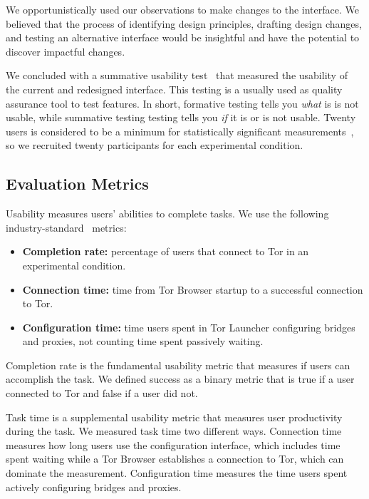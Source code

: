 \documentclass[USenglish,oneside,twocolumn]{article}
\begin{document}
We opportunistically used our observations to make changes to the interface. We believed that the process of identifying design principles, drafting design changes, and testing an alternative interface would be insightful and have the potential to discover impactful changes.

We concluded with a summative usability test~\cite{summative} that measured the usability of the current and redesigned interface. This testing is a usually used as quality assurance tool to test features. In short, formative testing tells you {\it what} is is not usable, while summative testing testing tells you {\it if} it is or is not usable. Twenty users is considered to be a minimum for statistically significant measurements~\cite{howmanyusers}, so we recruited twenty participants for each experimental condition.  

\subsection{Evaluation Metrics}
\label{sec:eval}
Usability measures users' abilities to complete tasks. We use the following industry-standard~\cite{albert2013measuring} metrics: \\

\begin{itemize}
\item {\bfseries Completion rate:}  percentage of users that connect to Tor in an experimental condition. 
\item {\bfseries Connection time:} time from Tor Browser startup to a successful connection to Tor. 
\item {\bfseries Configuration time:} time users spent in Tor Launcher configuring bridges and proxies, not counting time spent passively waiting.
\end{itemize}

Completion rate is the fundamental usability metric that measures if users can accomplish the task. We defined success as a binary metric that is true if a user connected to Tor and false if a user did not. 

Task time is a supplemental usability metric that measures user productivity during the task. We measured task time two different ways. Connection time measures how long users use the configuration interface, which includes time  spent waiting while a Tor Browser establishes a connection to Tor, which can dominate the measurement. Configuration time measures the time users spent actively configuring bridges and proxies. 
\end{document}
